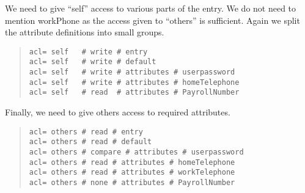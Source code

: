 We need to give ``self'' access to various parts of the entry.
We do not need to mention workPhone as the access given to ``others''
is sufficient.  Again we split the attribute definitions into small groups.
\begin{quote}\small\begin{verbatim}
acl= self   # write # entry
acl= self   # write # default
acl= self   # write # attributes # userpassword
acl= self   # write # attributes # homeTelephone
acl= self   # read  # attributes # PayrollNumber
\end{verbatim}\end{quote}

Finally, we need to give others access to required attributes.
\begin{quote}\small\begin{verbatim}
acl= others # read # entry
acl= others # read # default
acl= others # compare # attributes # userpassword
acl= others # read # attributes # homeTelephone
acl= others # read # attributes # workTelephone
acl= others # none # attributes # PayrollNumber
\end{verbatim}\end{quote}


